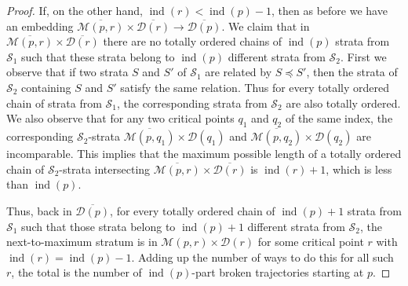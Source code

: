 \documentclass[psamsfonts]{amsart}
\theoremstyle{remark}
\DeclareMathOperator{\ind}{ind}
\begin{document}
\begin{proof}
If, on the other hand, $\ind(r) < \ind(p) - 1$, then as before we have an embedding $\overline{\mathcal{M}(p, r)} \times \overline{\mathcal{D}(r)} \rightarrow \overline{\mathcal{D}(p)}$.  We claim that in $\overline{\mathcal{M}(p, r)} \times \overline{\mathcal{D}(r)}$ there are no totally ordered chains of $\ind(p)$ strata from $\mathcal{S}_1$ such that these strata belong to $\ind(p)$ different strata from $\mathcal{S}_2$.  First we observe that if two strata $S$ and $S'$ of $\mathcal{S}_1$ are related by $S \preceq S'$, then the strata of $\mathcal{S}_2$ containing $S$ and $S'$ satisfy the same relation.  Thus for every totally ordered chain of strata from $\mathcal{S}_1$, the corresponding strata from $\mathcal{S}_2$ are also totally ordered.  We also observe that for any two critical points $q_1$ and $q_2$ of the same index, the corresponding $\mathcal{S}_2$-strata $\overline{\mathcal{M}(p, q_1)}\times \mathcal{D}(q_1)$ and $\overline{\mathcal{M}(p, q_2)}\times \mathcal{D}(q_2)$ are incomparable.  This implies that the maximum possible length of a totally ordered chain of $\mathcal{S}_2$-strata intersecting $\overline{\mathcal{M}(p, r)} \times \overline{\mathcal{D}(r)}$ is $\ind(r) + 1$, which is less than $\ind(p)$.

Thus, back in $\overline{\mathcal{D}(p)}$, for every totally ordered chain of $\ind(p) + 1$ strata from $\mathcal{S}_1$ such that those strata belong to $\ind(p) + 1$ different strata from $\mathcal{S}_2$, the next-to-maximum stratum is in $\mathcal{M}(p, r) \times \mathcal{D}(r)$ for some critical point $r$ with $\ind(r) = \ind(p) - 1$.  Adding up the number of ways to do this for all such $r$, the total is the number of $\ind(p)$-part broken trajectories starting at $p$.
\end{proof}
\end{document}
